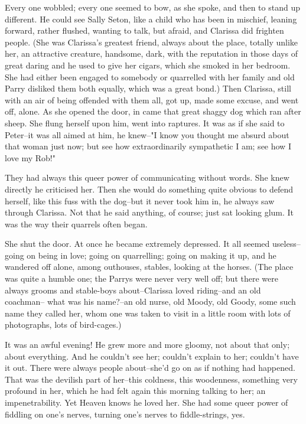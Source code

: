 \documentclass[lang=cn,10pt]{elegantbook}
\begin{document}
Every one wobbled; every one seemed to bow, as she spoke, and then
to stand up different.  He could see Sally Seton, like a child who
has been in mischief, leaning forward, rather flushed, wanting to
talk, but afraid, and Clarissa did frighten people.  (She was
Clarissa's greatest friend, always about the place, totally unlike
her, an attractive creature, handsome, dark, with the reputation in
those days of great daring and he used to give her cigars, which
she smoked in her bedroom.  She had either been engaged to somebody
or quarrelled with her family and old Parry disliked them both
equally, which was a great bond.)  Then Clarissa, still with an air
of being offended with them all, got up, made some excuse, and went
off, alone.  As she opened the door, in came that great shaggy dog
which ran after sheep.  She flung herself upon him, went into
raptures.  It was as if she said to Peter--it was all aimed at him,
he knew--"I know you thought me absurd about that woman just now;
but see how extraordinarily sympathetic I am; see how I love my
Rob!"

They had always this queer power of communicating without words.
She knew directly he criticised her.  Then she would do something
quite obvious to defend herself, like this fuss with the dog--but
it never took him in, he always saw through Clarissa.  Not that he
said anything, of course; just sat looking glum.  It was the way
their quarrels often began.

She shut the door.  At once he became extremely depressed.  It all
seemed useless--going on being in love; going on quarrelling; going
on making it up, and he wandered off alone, among outhouses,
stables, looking at the horses.  (The place was quite a humble one;
the Parrys were never very well off; but there were always grooms
and stable-boys about--Clarissa loved riding--and an old coachman--
what was his name?--an old nurse, old Moody, old Goody, some such
name they called her, whom one was taken to visit in a little room
with lots of photographs, lots of bird-cages.)

It was an awful evening!  He grew more and more gloomy, not about
that only; about everything.  And he couldn't see her; couldn't
explain to her; couldn't have it out.  There were always people
about--she'd go on as if nothing had happened.  That was the
devilish part of her--this coldness, this woodenness, something
very profound in her, which he had felt again this morning talking
to her; an impenetrability.  Yet Heaven knows he loved her.  She
had some queer power of fiddling on one's nerves, turning one's
nerves to fiddle-strings, yes.
\end{document}

